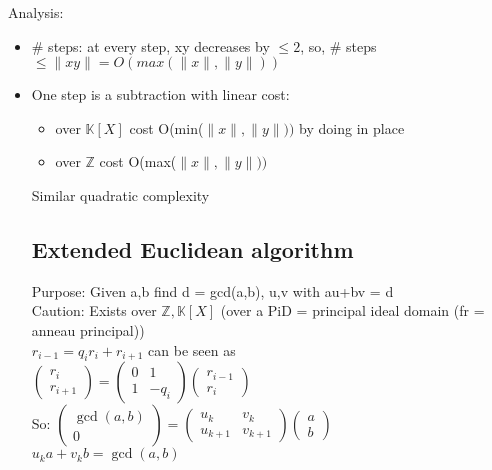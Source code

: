 \documentclass{article}
\theoremstyle{definition}
\theoremstyle{remark}
\newcommand{\Z}{\mathbb{Z}}
\newcommand{\K}{\mathbb{K}}
\begin{document}
Analysis: \begin{itemize}
	\item \# steps: at every step, xy decreases by $\leq 2$, so, \# steps $\leq \|xy\| = O(max(\|x\|,\|y\|))$
	\item One step is a subtraction with linear cost:\begin{itemize}
		\item over $\K[X]$ cost O(min($\|x\|,\|y\|))$ by doing in place
		\item over $\Z$ cost O(max($\|x\|,\|y\|))$
	\end{itemize}
	Similar quadratic complexity
	
\subsection{Extended Euclidean algorithm}
Purpose: Given a,b find d = gcd(a,b), u,v with au+bv = d\\
Caution: Exists over $\Z,\K[X]$ (over a PiD = principal ideal domain (fr = anneau principal))\\

$r_{i-1} = q_ir_i + r_{i+1}$ can be seen as\\
$\begin{pmatrix}
	r_i\\r_{i+1}
\end{pmatrix}
=
\begin{pmatrix}
0 & 1\\ 1 & -q_i
\end{pmatrix}
\begin{pmatrix}
r_{i-1} \\ r_i
\end{pmatrix}$\\

So: $\begin{pmatrix}
\gcd(a,b)\\0
\end{pmatrix}
=
\begin{pmatrix}
u_k & v_k\\ u_{k+1} & v_{k+1}
\end{pmatrix}
\begin{pmatrix}
a \\ b
\end{pmatrix}$\\

$u_ka+v_kb = \gcd(a,b)$\\


\end{itemize}
\end{document}
